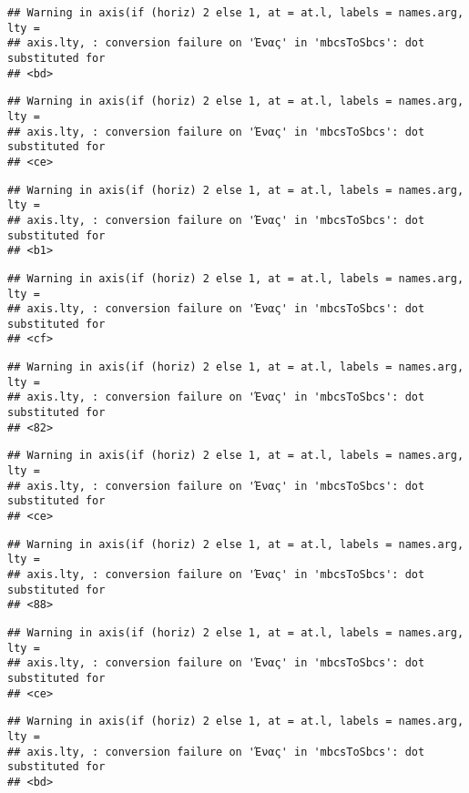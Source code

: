 \documentclass[
]{article}
\begin{document}
\begin{verbatim}
## Warning in axis(if (horiz) 2 else 1, at = at.l, labels = names.arg, lty =
## axis.lty, : conversion failure on 'Ένας' in 'mbcsToSbcs': dot substituted for
## <bd>
\end{verbatim}

\begin{verbatim}
## Warning in axis(if (horiz) 2 else 1, at = at.l, labels = names.arg, lty =
## axis.lty, : conversion failure on 'Ένας' in 'mbcsToSbcs': dot substituted for
## <ce>
\end{verbatim}

\begin{verbatim}
## Warning in axis(if (horiz) 2 else 1, at = at.l, labels = names.arg, lty =
## axis.lty, : conversion failure on 'Ένας' in 'mbcsToSbcs': dot substituted for
## <b1>
\end{verbatim}

\begin{verbatim}
## Warning in axis(if (horiz) 2 else 1, at = at.l, labels = names.arg, lty =
## axis.lty, : conversion failure on 'Ένας' in 'mbcsToSbcs': dot substituted for
## <cf>
\end{verbatim}

\begin{verbatim}
## Warning in axis(if (horiz) 2 else 1, at = at.l, labels = names.arg, lty =
## axis.lty, : conversion failure on 'Ένας' in 'mbcsToSbcs': dot substituted for
## <82>
\end{verbatim}

\begin{verbatim}
## Warning in axis(if (horiz) 2 else 1, at = at.l, labels = names.arg, lty =
## axis.lty, : conversion failure on 'Ένας' in 'mbcsToSbcs': dot substituted for
## <ce>
\end{verbatim}

\begin{verbatim}
## Warning in axis(if (horiz) 2 else 1, at = at.l, labels = names.arg, lty =
## axis.lty, : conversion failure on 'Ένας' in 'mbcsToSbcs': dot substituted for
## <88>
\end{verbatim}

\begin{verbatim}
## Warning in axis(if (horiz) 2 else 1, at = at.l, labels = names.arg, lty =
## axis.lty, : conversion failure on 'Ένας' in 'mbcsToSbcs': dot substituted for
## <ce>
\end{verbatim}

\begin{verbatim}
## Warning in axis(if (horiz) 2 else 1, at = at.l, labels = names.arg, lty =
## axis.lty, : conversion failure on 'Ένας' in 'mbcsToSbcs': dot substituted for
## <bd>
\end{verbatim}
\end{document}
